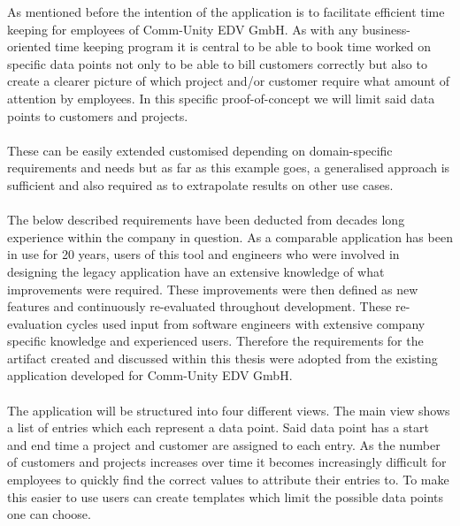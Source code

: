 
As mentioned before the intention of the application is to facilitate efficient time keeping 
for employees of Comm-Unity EDV GmbH. 
As with any business-oriented time keeping program it is central to be able to book 
time worked on specific data points not only to be able to bill customers correctly but also to 
create a clearer picture of which project and/or customer require what amount of attention by 
employees.
In this specific proof-of-concept we will limit said data points to customers and projects.\paragraph{}
These can be easily extended customised depending on domain-specific requirements and needs but as far 
as this example goes, a generalised approach is sufficient and also required as to extrapolate results 
on other use cases.\paragraph{}
The below described requirements have been deducted from decades long experience within the company in question.
As a comparable application has been in use for 20 years, users of this tool and engineers who were involved
in designing the legacy application have an extensive knowledge of what improvements were required.
These improvements were then defined as new features and continuously re-evaluated throughout development.
These re-evaluation cycles used input from software engineers with extensive company specific knowledge and
experienced users.
Therefore the requirements for the artifact created and discussed within this thesis were adopted from the existing
application developed for Comm-Unity EDV GmbH.\paragraph{}
The application will be structured into four different views. 
The main view shows a list of entries which each represent a data point.
Said data point has a start and end time a project and customer are assigned to each entry. 
As the number of customers and projects increases over time it becomes increasingly difficult for 
employees to quickly find the correct values to attribute their entries to.
To make this easier to use users can create templates which limit the possible data points one can
choose.\paragraph{}
